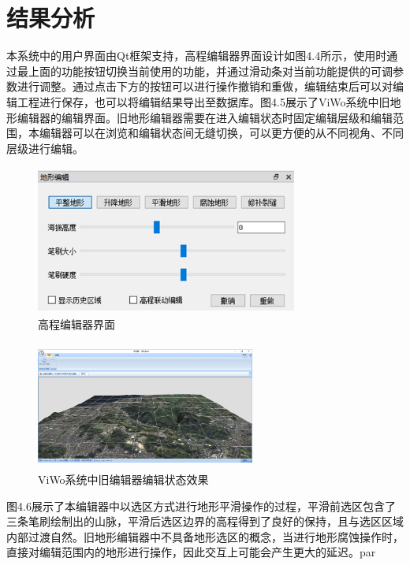 \section{结果分析}
本系统中的用户界面由Qt框架支持，高程编辑器界面设计如图4.4所示，使用时通过最上面的功能按钮切换当前使用的功能，并通过滑动条对当前功能提供的可调参数进行调整。通过点击下方的按钮可以进行操作撤销和重做，编辑结束后可以对编辑工程进行保存，也可以将编辑结果导出至数据库。图4.5展示了ViWo系统中旧地形编辑器的编辑界面。旧地形编辑器需要在进入编辑状态时固定编辑层级和编辑范围，本编辑器可以在浏览和编辑状态间无缝切换，可以更方便的从不同视角、不同层级进行编辑。
\begin{figure}[htbp]
    \centering
    \includegraphics[height=4.9cm,width=8.6cm]{figures/demInterface.png}
  \caption{高程编辑器界面}
  \end{figure}
  
  \begin{figure}[h]
\centering
\includegraphics[height=4.2cm        ,width=7.2cm]{figures/old.png}
\caption{ViWo系统中旧编辑器编辑状态效果}
\end{figure}
图4.6展示了本编辑器中以选区方式进行地形平滑操作的过程，平滑前选区包含了三条笔刷绘制出的山脉，平滑后选区边界的高程得到了良好的保持，且与选区区域内部过渡自然。旧地形编辑器中不具备地形选区的概念，当进行地形腐蚀操作时，直接对编辑范围内的地形进行操作，因此交互上可能会产生更大的延迟。par

